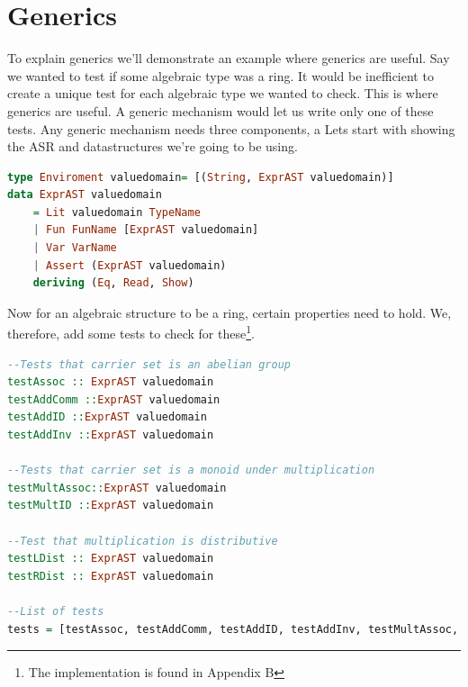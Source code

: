 \documentclass[tikz, border=5mm]{article}
\begin{document}
    \section{Generics}
        To explain generics we'll demonstrate an example where generics are useful. Say we wanted to test if some algebraic type was a ring.
        It would be inefficient to create a unique test for each algebraic type we wanted to check. This is where generics are useful.
        A generic mechanism would let us write only one of these tests. 
        Any generic mechanism needs three components, a
        Lets start with showing the ASR and datastructures we're going to be using.
        \begin{lstlisting}[language=Haskell]
type Enviroment valuedomain= [(String, ExprAST valuedomain)]
data ExprAST valuedomain
    = Lit valuedomain TypeName
    | Fun FunName [ExprAST valuedomain]
    | Var VarName
    | Assert (ExprAST valuedomain)
    deriving (Eq, Read, Show)
        \end{lstlisting}
        Now for an algebraic structure to be a ring, certain properties need to hold. We, therefore, add some tests to check for these\footnote{The implementation is found in Appendix B}.
        \begin{lstlisting}[language=Haskell]
--Tests that carrier set is an abelian group
testAssoc :: ExprAST valuedomain
testAddComm ::ExprAST valuedomain
testAddID ::ExprAST valuedomain
testAddInv ::ExprAST valuedomain

--Tests that carrier set is a monoid under multiplication
testMultAssoc::ExprAST valuedomain
testMultID ::ExprAST valuedomain

--Test that multiplication is distributive
testLDist :: ExprAST valuedomain
testRDist :: ExprAST valuedomain

--List of tests
tests = [testAssoc, testAddComm, testAddID, testAddInv, testMultAssoc, testMultID, testLDist, testRDist]

        \end{lstlisting}
\end{document}
